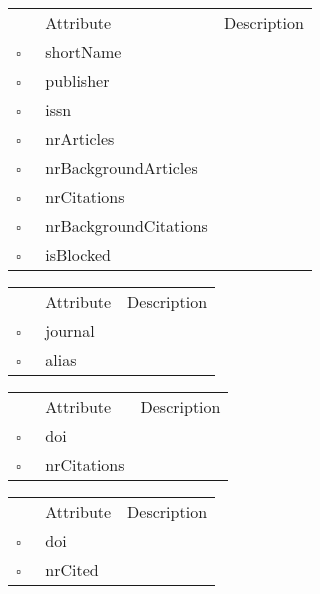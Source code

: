 \begin{table}
\caption{Journal  }

\begin{longtable}{llp{8cm}}
& Attribute & Description \\
$\square$\ & shortName &  \\
$\square$\ & publisher &  \\
$\square$\ & issn &  \\
$\square$\ & nrArticles &  \\
$\square$\ & nrBackgroundArticles &  \\
$\square$\ & nrCitations &  \\
$\square$\ & nrBackgroundCitations &  \\
$\square$\ & isBlocked &  \\
\end{longtable}
\label{attr:Journal}
\end{table}

\clearpage
\begin{table}
\caption{JournalAlias  }

\begin{longtable}{llp{8cm}}
& Attribute & Description \\
$\square$\ & journal &  \\
$\square$\ & alias &  \\
\end{longtable}
\label{attr:JournalAlias}
\end{table}

\begin{table}
\caption{MissingCitedWork  }

\begin{longtable}{llp{8cm}}
& Attribute & Description \\
$\square$\ & doi &  \\
$\square$\ & nrCitations &  \\
\end{longtable}
\label{attr:MissingCitedWork}
\end{table}

\begin{table}
\caption{MissingCitingWork  }

\begin{longtable}{llp{8cm}}
& Attribute & Description \\
$\square$\ & doi &  \\
$\square$\ & nrCited &  \\
\end{longtable}
\label{attr:MissingCitingWork}
\end{table}

